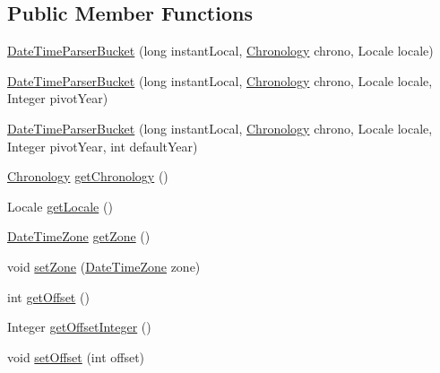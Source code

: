 \subsection*{Public Member Functions}
\begin{DoxyCompactItemize}
\item 
\hyperlink{classorg_1_1joda_1_1time_1_1format_1_1_date_time_parser_bucket_a592a00ec9175a3cd84bce739ef4083ae}{Date\-Time\-Parser\-Bucket} (long instant\-Local, \hyperlink{classorg_1_1joda_1_1time_1_1_chronology}{Chronology} chrono, Locale locale)
\item 
\hyperlink{classorg_1_1joda_1_1time_1_1format_1_1_date_time_parser_bucket_a28b15b964ac538cb87825dcdfe04c131}{Date\-Time\-Parser\-Bucket} (long instant\-Local, \hyperlink{classorg_1_1joda_1_1time_1_1_chronology}{Chronology} chrono, Locale locale, Integer pivot\-Year)
\item 
\hyperlink{classorg_1_1joda_1_1time_1_1format_1_1_date_time_parser_bucket_a1b0dee6ae281b2234c78c350722dc245}{Date\-Time\-Parser\-Bucket} (long instant\-Local, \hyperlink{classorg_1_1joda_1_1time_1_1_chronology}{Chronology} chrono, Locale locale, Integer pivot\-Year, int default\-Year)
\item 
\hyperlink{classorg_1_1joda_1_1time_1_1_chronology}{Chronology} \hyperlink{classorg_1_1joda_1_1time_1_1format_1_1_date_time_parser_bucket_a9e6052e009ec1d2d6ee69f63c16da6d3}{get\-Chronology} ()
\item 
Locale \hyperlink{classorg_1_1joda_1_1time_1_1format_1_1_date_time_parser_bucket_aa242b54091580310935f421409fe12be}{get\-Locale} ()
\item 
\hyperlink{classorg_1_1joda_1_1time_1_1_date_time_zone}{Date\-Time\-Zone} \hyperlink{classorg_1_1joda_1_1time_1_1format_1_1_date_time_parser_bucket_a9d188ea33a77b3ab8d34eb2f5399ec2c}{get\-Zone} ()
\item 
void \hyperlink{classorg_1_1joda_1_1time_1_1format_1_1_date_time_parser_bucket_a812b5ef8f4016fe72dd258dacfb568dd}{set\-Zone} (\hyperlink{classorg_1_1joda_1_1time_1_1_date_time_zone}{Date\-Time\-Zone} zone)
\item 
int \hyperlink{classorg_1_1joda_1_1time_1_1format_1_1_date_time_parser_bucket_a05d39ffec6143eb80320d437694702c1}{get\-Offset} ()
\item 
Integer \hyperlink{classorg_1_1joda_1_1time_1_1format_1_1_date_time_parser_bucket_a5919015cabbba311b9985b26f766ab39}{get\-Offset\-Integer} ()
\item 
void \hyperlink{classorg_1_1joda_1_1time_1_1format_1_1_date_time_parser_bucket_a9bdf3b4b79e524fc13daf0e0168cfd19}{set\-Offset} (int offset)

\end{DoxyCompactItemize}

